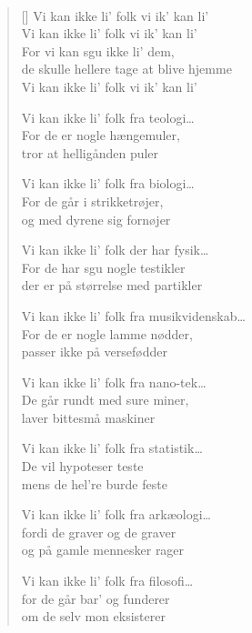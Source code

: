 \\[.2em]

{\setlength{\columnsep}{15pt}
\begin{multicols}{3}
\settowidth{\versewidth}{Vi kan ikke li' folk fra matematik\ldots}
\begin{verse}[\versewidth]
Vi kan ikke li' folk
vi ik' kan li'\\
Vi kan ikke li' folk
vi ik' kan li'\\
For vi kan sgu ikke li' dem,\\
de skulle hellere tage at blive hjemme\\
Vi kan ikke li' folk
vi ik' kan li'

Vi kan ikke li' folk fra teologi\ldots\\
For de er nogle hængemuler,\\
tror at helligånden puler

Vi kan ikke li' folk fra biologi\ldots\\
For de går i strikketrøjer,\\
og med dyrene sig fornøjer

Vi kan ikke li' folk der har fysik\ldots\\
For de har sgu nogle testikler\\
der er på størrelse med partikler

Vi kan ikke li' folk fra musikvidenskab\ldots\\
For de er nogle lamme nødder,\\
passer ikke på versefødder

Vi kan ikke li' folk fra nano-tek\ldots\\
De går rundt med sure miner,\\
laver bittesmå maskiner

Vi kan ikke li' folk fra statistik\ldots\\
De vil hypoteser teste\\
mens de hel're burde feste
\columnbreak

Vi kan ikke li' folk fra arkæologi\ldots\\
fordi de graver og de graver\\
og på gamle mennesker rager

Vi kan ikke li' folk fra filosofi\ldots\\
for de går bar' og funderer\\
om de selv mon eksisterer


\end{verse}
\end{multicols}}

